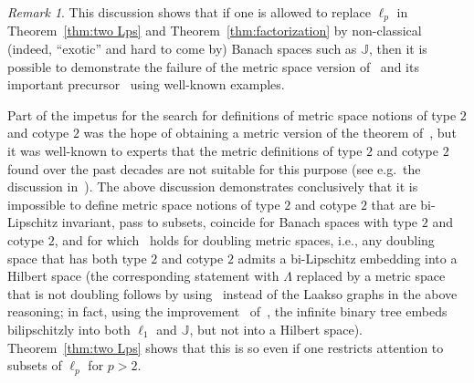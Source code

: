 \documentclass[11pt,reqno]{amsart}
\newcommand{\0}{\mathbf{0}}
\renewcommand{\1}{\mathbf 1}
\renewcommand{\subset}{\subseteq}
\theoremstyle{remark}
\newtheorem{remark}[thm]{Remark}
\begin{document}
\begin{remark}
  This discussion shows that if one is allowed to replace $\ell_p$ in Theorem~\ref{thm:two Lps}  and Theorem~\ref{thm:factorization}  by non-classical (indeed, ``exotic'' and hard to come by) Banach spaces such as $\mathbb{J}$, then it is possible to demonstrate the failure of the metric space version of~\cite{Mau74} and its important precursor~\cite{Kwa72} using well-known examples.

  Part of the impetus for the search for definitions of metric space notions of type $2$ and cotype $2$  was the hope of obtaining a metric version of the theorem of~\cite{Kwa72}, but it was well-known to experts that the metric definitions of type $2$ and cotype $2$ found over the past decades are not suitable for this purpose (see e.g.~the discussion in~\cite{DLP13}).  The above discussion demonstrates conclusively that it is impossible to define metric space notions of type $2$ and cotype $2$  that are bi-Lipschitz invariant, pass to subsets, coincide for Banach spaces with  type $2$ and cotype $2$, and for which~\cite{Kwa72} holds for doubling metric spaces, i.e., any doubling space that has both type $2$ and cotype $2$ admits a bi-Lipschitz embedding into a Hilbert space (the corresponding statement with $\Lambda$ replaced by a metric space that is not doubling follows by using~\cite{Bou86} instead of the Laakso graphs in the above reasoning; in fact, using the improvement~\cite{Bau07} of~\cite{Bou86}, the infinite binary tree embeds bilipschitzly into both $\ell_1$ and $\mathbb{J}$, but not into a Hilbert space).   Theorem~\ref{thm:two Lps}  shows that this is so even if one restricts attention to subsets of $\ell_p$ for $p>2$.
\end{remark}

\end{document}
